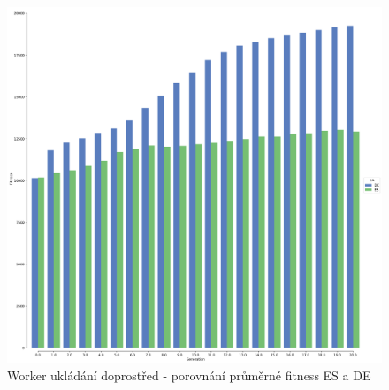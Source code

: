 	\begin{figure}[t]\centering
		\includegraphics[width=\columnwidth]{../img/WoodMap/DEvsES/Stock.png}
		\caption{Worker ukládání doprostřed  - porovnání průměrné fitness ES a DE}
		\label{obr04:StockESvsDE}
	\end{figure}
